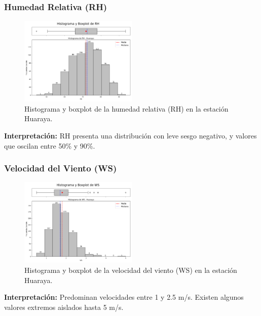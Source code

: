 \subsubsection*{Humedad Relativa (RH)}
\begin{figure}[H]
\centering
\includegraphics[width=0.5\textwidth]{resultados/por_estacion_meteorologica/Huaraya/RH_histograma.png}
\caption{Histograma y boxplot de la humedad relativa (RH) en la estación Huaraya.}
\label{fig:huaraya_RH}
\end{figure}
\textbf{Interpretación:} RH presenta una distribución con leve sesgo negativo, y valores que oscilan entre 50\% y 90\%.

\subsubsection*{Velocidad del Viento (WS)}
\begin{figure}[H]
\centering
\includegraphics[width=0.5\textwidth]{resultados/por_estacion_meteorologica/Huaraya/WS_histograma.png}
\caption{Histograma y boxplot de la velocidad del viento (WS) en la estación Huaraya.}
\label{fig:huaraya_WS}
\end{figure}
\textbf{Interpretación:} Predominan velocidades entre 1 y 2.5 m/s. Existen algunos valores extremos aislados hasta 5 m/s.


